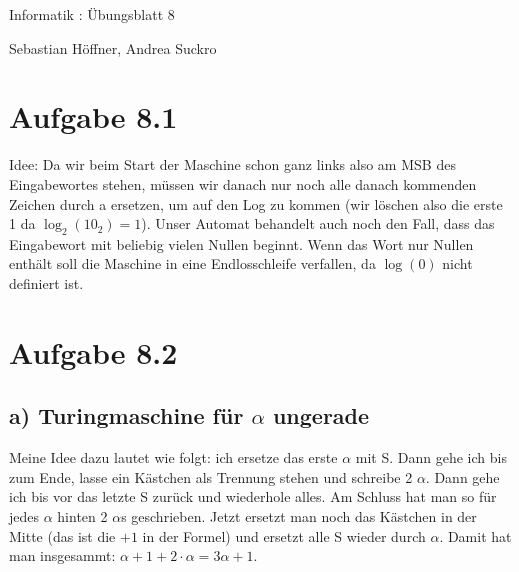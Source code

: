 \documentclass{article}
\begin{document}
\begin{center}
  \Large{Informatik \revD: Übungsblatt 8}

  \large{Sebastian Höffner, Andrea Suckro}
\end{center}



\section*{Aufgabe 8.1}
Idee: Da wir beim Start der Maschine schon ganz links also am MSB des Eingabewortes stehen, müssen wir danach nur noch alle danach kommenden Zeichen durch a ersetzen, um auf den Log zu kommen (wir löschen also die erste 1 da $\log_2(10_2) = 1$). Unser Automat behandelt auch noch den Fall, dass das Eingabewort mit beliebig vielen Nullen beginnt. Wenn das Wort nur Nullen enthält soll die Maschine in eine Endlosschleife verfallen, da $\log(0)$ nicht definiert ist.
\begin{center}
\end{center}

\section*{Aufgabe 8.2}
\subsection*{a) Turingmaschine für $\alpha$ ungerade}
Meine Idee dazu lautet wie folgt: ich ersetze das erste $\alpha$ mit S. Dann gehe ich bis zum Ende, lasse ein Kästchen als Trennung stehen und schreibe 2 $\alpha$. Dann gehe ich bis vor das letzte S zurück und wiederhole alles. Am Schluss hat man so für jedes $\alpha$ hinten 2 $\alpha$s geschrieben. Jetzt ersetzt man noch das Kästchen in der Mitte (das ist die $+1$ in der Formel) und ersetzt alle S wieder durch $\alpha$. Damit hat man insgesammt: $\alpha+1+2\cdot \alpha = 3\alpha +1$.
\end{document}
